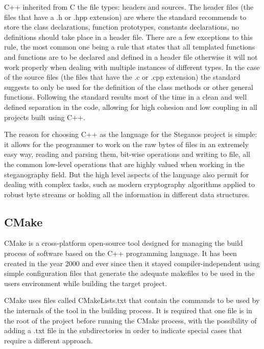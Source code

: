 C++ inherited from C the file types: headers and sources. The header files (the files that have a .h or .hpp extension) are where the standard recommends to store the class declarations, function prototypes, constants declarations, no definitions should take place in a header file. There are a few exceptions to this rule, the most common one being a rule that states that all templated functions and functions are to be declared and defined in a header file otherwise it will not work properly when dealing with multiple instances of different types. In the case of the source files (the files that have the .c or .cpp extension) the standard suggests to only be used for the definition of the class methods or other general functions. Following the standard results most of the time in a clean and well defined separation in the code, allowing for high cohesion and low coupling in all projects built using C++.

The reason for choosing C++ as the language for the Steganos project is simple: it allows for the programmer to work on the raw bytes of files in an extremely easy way, reading and parsing them, bit-wise operations and writing to file, all the common low-level operations that are highly valued when working in the steganography field. But the high level aspects of the language also permit for dealing with complex tasks, such as modern cryptography algorithms applied to robust byte streams or holding all the information in different data structures.

\subsection{CMake}
CMake is a cross-platform open-source tool designed for managing the build process of software based on the C++ programming language. It has been created in the year 2000 and ever since then it stayed compiler-independent using simple configuration files that generate the adequate makefiles to be used in the users environment while building the target project\cite{cmake}.

CMake uses files called CMakeLists.txt that contain the commands to be used by the internals of the tool in the building process. It is required that one file is in the root of the project before running the CMake process, with the possibility of adding a .txt file in the subdirectories in order to indicate special cases that require a different approach.

